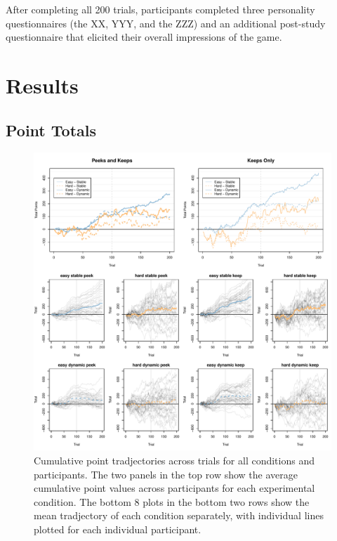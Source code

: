 \documentclass[a4paper,doc,natbib,floatsintext]{apa6}\usepackage[]{graphicx}\usepackage[]{color}
\makeatletter
\def\maxwidth{ %
  \ifdim\Gin@nat@width>\linewidth
    \linewidth
  \else
    \Gin@nat@width
  \fi
}
\newenvironment{knitrout}{}{} %
\makeatother
\begin{document}
After completing all 200 trials, participants completed three personality questionnaires (the XX, YYY, and the ZZZ) and an additional post-study questionnaire that elicited their overall impressions of the game.

\section{Results}

\subsection{Point Totals}

\begin{figure}
\centering
\begin{knitrout}
\color{fgcolor}
\includegraphics[width=\maxwidth]{figure/unnamed-chunk-12-1} 

\end{knitrout}
\caption{\label{fig:pointsbytrial}Cumulative point tradjectories across trials for all conditions and participants. The two panels in the top row show the average cumulative point values across participants for each experimental condition. The bottom 8 plots in the bottom two rows show the mean tradjectory of each condition separately, with individual lines plotted for each individual participant.}
\end{figure}
\end{document}
